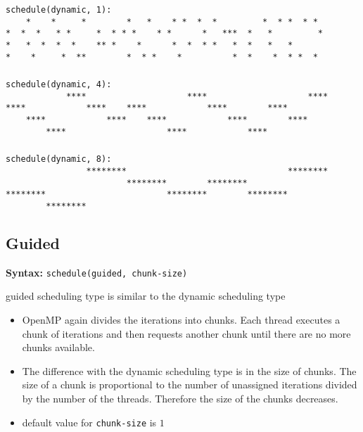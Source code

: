 \documentclass[paper=letter, fontsize=12pt]{article}
\begin{document}
\subsubsection{}
\begin{verbatim}
schedule(dynamic, 1):
    *    *     *        *   *    * *  *  *         *  * *  * *  
*  *  *   * *     *  * * *    * *      *   ***  *   *         * 
*   *  *  *  *    ** *    *      *  *  * *   *  *   *   *      
*    *     *  **        *  * *    *          *  *    *  * *  *
\end{verbatim}

\subsubsection{}
\begin{verbatim}
schedule(dynamic, 4):
            ****                    ****                    ****
****            ****    ****            ****        ****        
    ****            ****    ****            ****        ****    
        ****                    ****            ****            
\end{verbatim}

\subsubsection{}
\begin{verbatim}
schedule(dynamic, 8):  
                ********                                ********
                        ********        ********                
********                        ********        ********        
        ********                                                
\end{verbatim}

\subsection{Guided}
\textbf{Syntax:} \verb|schedule(guided, chunk-size)|

guided scheduling type is similar to the dynamic scheduling type

\begin{itemize}
    \item OpenMP again divides the iterations into chunks. Each thread executes a chunk of iterations and then requests another chunk until there are no more chunks available.
    \item The difference with the dynamic scheduling type is in the size of chunks. The size of a chunk is proportional to the number of unassigned iterations divided by the number of the threads. Therefore the size of the chunks decreases.
    \item default value for \verb|chunk-size| is $ 1 $
\end{itemize}
\end{document}

